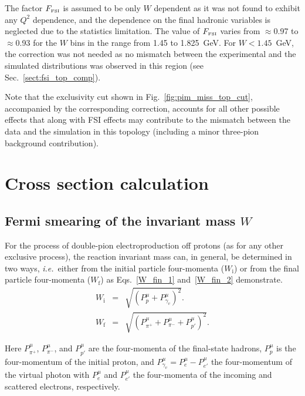 \documentclass[prc,twocolumn,superscriptaddress,showpacs,amssymb,amsmath,amsfonts,aps,nofootinbib]{revtex4-1}
\begin{document}
The factor $F_{\text{\tiny FSI}}$ is assumed to be only $W$ dependent as it was not found to exhibit any $Q^{2}$ dependence, and the dependence on the final hadronic variables is neglected due to the statistics limitation. The value of $F_{\text{\tiny FSI}}$ varies from $\approx$0.97 to $\approx$0.93 for the $W$ bins in the range from 1.45 to 1.825~GeV. For $W < 1.45$~GeV, the correction was not needed as no mismatch between the experimental and the simulated distributions was observed in this region (see Sec.\!~\ref{sect:fsi_top_comp}).


Note that the exclusivity cut shown in Fig.\!~\ref{fig:pim_miss_top_cut}, accompanied by the corresponding correction, accounts for all other possible effects that along with FSI effects may contribute to the mismatch between the data and the simulation in this topology (including a minor three-pion background contribution).


\section{Cross section calculation}

\subsection{Fermi smearing of the invariant mass $W$}
\label{Sect:smearing_blurring}


For the process of double-pion electroproduction off protons (as for any other exclusive process), the reaction invariant mass can, in general, be determined in two ways, {\it i.e.}~either from the initial particle  four-momenta ($W_{\text{i}}$) or from the final particle  four-momenta ($W_{\text{f}}$) as Eqs.\!~\eqref{W_fin_1} and~\eqref{W_fin_2} demonstrate. 
\begin{eqnarray}
W_{\text{i}}&= & \sqrt{(P_{p}^{\mu}+P_{\gamma_{v}}^{\mu})^{2}} \label{W_fin_1}. \\
W_{\text{f}}&= & \sqrt{(P_{\pi^{+}}^{\mu}+P_{\pi^{-}}^{\mu}+P_{p'}^{\mu})^{2}}. \label{W_fin_2}
\end{eqnarray}

Here $P_{\pi^{+}}^{\mu}$, $P_{\pi^{-}}^{\mu}$, and $P_{p'}^{\mu}$ are the four-momenta of the final-state hadrons, $P_{p}^{\mu}$ is the four-momentum of the initial proton, and $P_{\gamma_{v}}^{\mu}=P_{e}^{\mu}-P_{e'}^{\mu}$ the four-momentum of the virtual photon with $P_{e}^{\mu}$ and $P_{e'}^{\mu}$ the four-momenta of the incoming and scattered electrons, respectively. 
\end{document}
